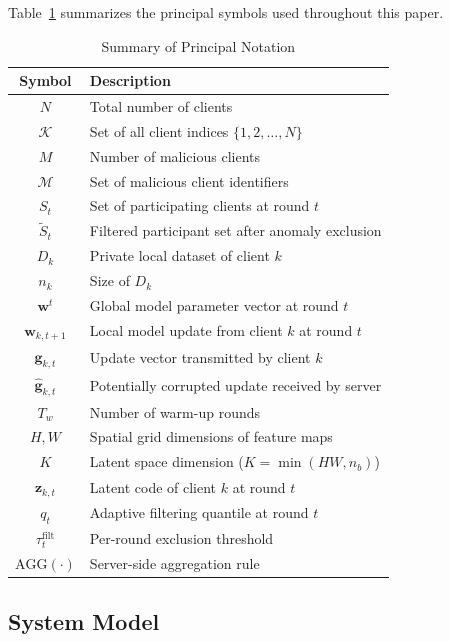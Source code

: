 \documentclass[journal]{IEEEtran}
\begin{document}
Table~\ref{tab:notation} summarizes the principal symbols used throughout this paper.

\begin{table}[t]
\centering
\caption{Summary of Principal Notation}
\label{tab:notation}
\begin{tabular}{@{}cl@{}}
\toprule
\textbf{Symbol} & \textbf{Description} \\
\midrule
$N$ & Total number of clients \\
$\mathcal{K}$ & Set of all client indices $\{1, 2, \ldots, N\}$ \\
$M$ & Number of malicious clients \\
$\mathcal{M}$ & Set of malicious client identifiers \\
$S_t$ & Set of participating clients at round $t$ \\
$\tilde{S}_t$ & Filtered participant set after anomaly exclusion \\
$D_k$ & Private local dataset of client $k$ \\
$n_k$ & Size of $D_k$ \\
$\mathbf{w}^t$ & Global model parameter vector at round $t$ \\
$\mathbf{w}_{k,t+1}$ & Local model update from client $k$ at round $t$ \\
$\mathbf{g}_{k,t}$ & Update vector transmitted by client $k$ \\
$\hat{\mathbf{g}}_{k,t}$ & Potentially corrupted update received by server \\
$T_w$ & Number of warm-up rounds \\
$H, W$ & Spatial grid dimensions of feature maps \\
$K$ & Latent space dimension ($K = \min(HW, n_b)$) \\
$\mathbf{z}_{k,t}$ & Latent code of client $k$ at round $t$ \\
$q_t$ & Adaptive filtering quantile at round $t$ \\
$\tau_t^{\text{filt}}$ & Per-round exclusion threshold \\
$\text{AGG}(\cdot)$ & Server-side aggregation rule \\
\bottomrule
\end{tabular}
\end{table}

\subsection{System Model}
\end{document}

